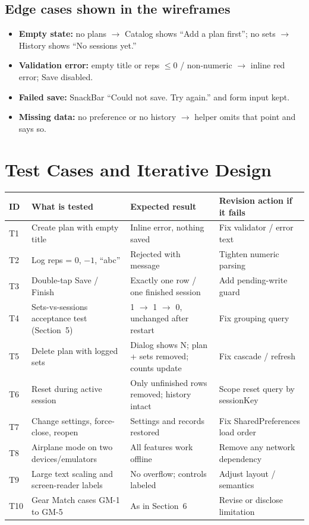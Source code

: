 \documentclass[11pt]{article}
\begin{document}
\subsection{Edge cases shown in the wireframes}
\begin{itemize}
  \item \textbf{Empty state:} no plans $\rightarrow$ Catalog shows ``Add a plan first''; no sets $\rightarrow$ History shows ``No sessions yet.''
  \item \textbf{Validation error:} empty title or reps $\le 0$ / non-numeric $\rightarrow$ inline red error; Save disabled.
  \item \textbf{Failed save:} SnackBar ``Could not save. Try again.'' and form input kept.
  \item \textbf{Missing data:} no preference or no history $\rightarrow$ helper omits that point and says so.
\end{itemize}

\section{Test Cases and Iterative Design}

\begin{tabularx}{\textwidth}{@{}P{0.9cm}LLL@{}}
\toprule
\textbf{ID} & \textbf{What is tested} & \textbf{Expected result} & \textbf{Revision action if it fails} \\
\midrule
T1 & Create plan with empty title & Inline error, nothing saved & Fix validator / error text \\
T2 & Log reps = 0, $-1$, ``abc'' & Rejected with message & Tighten numeric parsing \\
T3 & Double-tap Save / Finish & Exactly one row / one finished session & Add pending-write guard \\
T4 & Sets-vs-sessions acceptance test (Section~5) & 1 $\rightarrow$ 1 $\rightarrow$ 0, unchanged after restart & Fix grouping query \\
T5 & Delete plan with logged sets & Dialog shows N; plan + sets removed; counts update & Fix cascade / refresh \\
T6 & Reset during active session & Only unfinished rows removed; history intact & Scope reset query by sessionKey \\
T7 & Change settings, force-close, reopen & Settings and records restored & Fix SharedPreferences load order \\
T8 & Airplane mode on two devices/emulators & All features work offline & Remove any network dependency \\
T9 & Large text scaling and screen-reader labels & No overflow; controls labeled & Adjust layout / semantics \\
T10 & Gear Match cases GM-1 to GM-5 & As in Section~6 & Revise or disclose limitation \\
\bottomrule
\end{tabularx}
\end{document}
